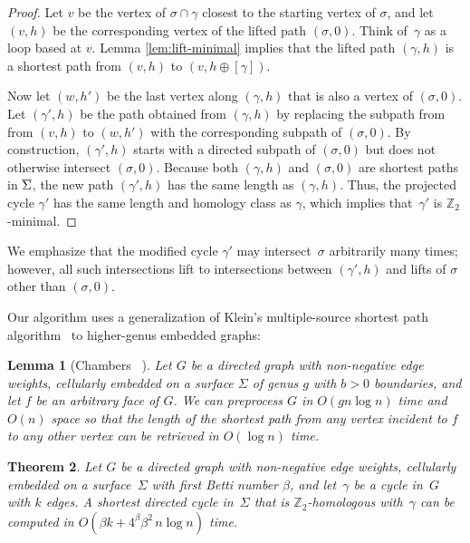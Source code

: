 \documentclass[11pt,twoside]{article}
\def\Z{\mathbb{Z}}
\let\cycle\gamma
\def\Sigmabar{\overline{\smash{\Sigma}\vphantom{t}}}
\newtheorem{theorem}{Theorem}[section]
\newtheorem{lemma}[theorem]{Lemma}
\begin{document}
{\begin{proof}
Let $v$ be the vertex of $\sigma\cap\cycle$ closest to the starting vertex of $\sigma$, and let $(v,h)$ be the corresponding vertex of the lifted path $(\sigma,0)$.  Think of~$\cycle$ as a loop based at $v$.  Lemma \ref{lem:lift-minimal} implies that the lifted path $(\cycle, h)$ is a shortest path from $(v,h)$ to $(v,h\oplus [\cycle])$.

Now let $(w,h')$ be the last vertex along $(\cycle,h)$ that is also a vertex of $(\sigma,0)$.  Let $(\cycle', h)$ be the path obtained from $(\cycle, h)$ by replacing the subpath from from $(v,h)$ to $(w,h')$ with the corresponding subpath of $(\sigma,0)$.  By construction, $(\cycle', h)$ starts with a directed subpath of $(\sigma,0)$ but does not otherwise intersect $(\sigma,0)$.   Because both $(\cycle, h)$ and $(\sigma,0)$ are shortest paths in $\Sigmabar$, the new path $(\cycle', h)$ has the same length as $(\cycle, h)$.  Thus, the projected cycle $\cycle'$ has the same length and homology class as $\cycle$, which implies that~$\cycle'$ is $\Z_2$-minimal.
\end{proof}

We emphasize that the modified cycle $\cycle'$ may intersect~$\sigma$ arbitrarily many times; however, all such intersections lift to intersections between $(\cycle', h)$ and lifts of $\sigma$ other than $(\sigma, 0)$.

Our algorithm uses a generalization of Klein's  multiple-source shortest path algorithm~\cite{k-msspp-05} to higher-genus embedded graphs:

\begin{lemma}[Chambers \etal~\cite{cce-msspe-13}]
\label{lem:multishort}
Let $G$ be a directed graph with non-negative edge weights, cellularly embedded on a surface $\Sigma$ of genus $g$ with $b>0$ boundaries, and let $f$ be an arbitrary face of $G$.  We can preprocess $G$ in $O(gn\log n)$ time and $O(n)$ space so that the length of the shortest path from any vertex incident to $f$ to any other vertex can be retrieved in $O(\log n)$ time.
\end{lemma}

\begin{theorem}
\label{thm:min-cycle}
Let $G$ be a directed graph with non-negative edge weights, cellularly embedded on a surface~$\Sigma$ with first Betti number $\beta$, and let~$\cycle$ be a cycle in~$G$ with $k$ edges.  A shortest directed cycle in~$\Sigma$ that is $\Z_2$-homologous with~$\cycle$ can be computed in $O(\beta k + 4^\beta \beta^2\, n\log n)$ time.
\end{theorem}

}
\end{document}
